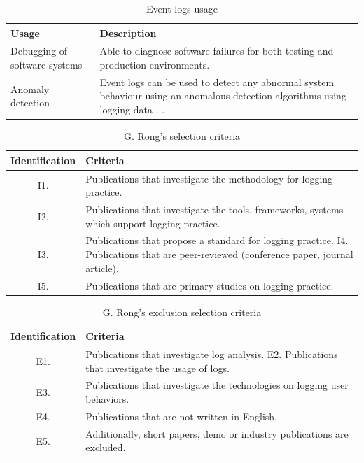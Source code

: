\begin{table}[!htb]
	\centering
	\small
	\caption{Event logs usage}
	\label{tbl:CH1_EventLogsUsage}
	\begin{tabularx}{\textwidth}{|l|X|}
		\hline \textbf{Usage} & \textbf{Description} \\
		\hline Debugging of software systems & Able to diagnose software failures for both testing and production environments.\\
		\hline Anomaly detection & Event logs can be used to detect any abnormal system behaviour using an anomalous detection algorithms using logging data \cite{Gurumdimma2016}.  \cite{Dwyer2013}. \\
		\hline
	\end{tabularx}
\end{table}

\clearpage

\begin{table}[!htb]
	\centering
	\small
	\caption{G. Rong's selection criteria \cite{Rong2018a}}
	\label{tbl:CH1_RongIncSelectionCriteria}
	\begin{tabularx}{\textwidth}{|c|X|}
		\hline \textbf{Identification} & \textbf{Criteria} \\
		\hline I1. & Publications that investigate the methodology for logging practice. \\
		\hline I2. & Publications that investigate the tools, frameworks, systems which support logging practice. \\
		\hline I3. & Publications that propose a standard for logging practice. I4. Publications that are peer-reviewed (conference paper, journal article). \\
		\hline I5. & Publications that are primary studies on logging practice. \\
		\hline
	\end{tabularx}
\end{table}

\begin{table}[!htb]
	\centering
	\small
	\caption{G. Rong's exclusion selection criteria \cite{Rong2018a}}
	\label{tbl:CH1_RongExlSelectionCriteria}
	\begin{tabularx}{\textwidth}{|c|X|}
		\hline \textbf{Identification} & \textbf{Criteria} \\
		\hline E1.& Publications that investigate log analysis. E2. Publications that investigate the usage of logs. \\
		\hline E3. & Publications that investigate the technologies on logging user behaviors. \\
		\hline E4. & Publications that are not written in English. \\
		\hline  E5. & Additionally, short papers, demo or industry publications are excluded. \\
		\hline
	\end{tabularx}
\end{table}

